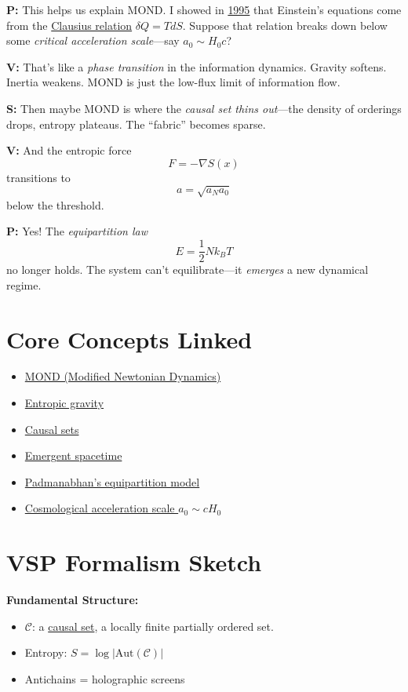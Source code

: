 \documentclass[12pt]{article}
\begin{document}
\textbf{P:} This helps us explain MOND. I showed in \href{https://arxiv.org/abs/gr-qc/9504004}{1995} that Einstein’s equations come from the \href{https://en.wikipedia.org/wiki/Clausius_relation}{Clausius relation} \( \delta Q = T dS \). Suppose that relation breaks down below some \textit{critical acceleration scale}—say \( a_0 \sim H_0 c \)?

\textbf{V:} That’s like a \textit{phase transition} in the information dynamics. Gravity softens. Inertia weakens. MOND is just the low-flux limit of information flow.

\textbf{S:} Then maybe MOND is where the \textit{causal set thins out}—the density of orderings drops, entropy plateaus. The ``fabric'' becomes sparse.

\textbf{V:} And the entropic force 
\[
F = -\nabla S(x)
\]
transitions to 
\[
a = \sqrt{a_N a_0}
\]
below the threshold.

\textbf{P:} Yes! The \textit{equipartition law}
\[
E = \frac{1}{2} N k_B T
\]
no longer holds. The system can’t equilibrate—it \textit{emerges} a new dynamical regime.

\section*{Core Concepts Linked}

\begin{itemize}
    \item \href{https://en.wikipedia.org/wiki/Modified_Newtonian_dynamics}{MOND (Modified Newtonian Dynamics)}
    \item \href{https://en.wikipedia.org/wiki/Entropic_gravity}{Entropic gravity}
    \item \href{https://en.wikipedia.org/wiki/Causal_set_theory}{Causal sets}
    \item \href{https://arxiv.org/abs/gr-qc/0606061}{Emergent spacetime}
    \item \href{https://arxiv.org/abs/0912.3165}{Padmanabhan’s equipartition model}
    \item \href{https://arxiv.org/abs/1609.05917}{Cosmological acceleration scale \( a_0 \sim c H_0 \)}
\end{itemize}

\section*{VSP Formalism Sketch}

\textbf{Fundamental Structure:}
\begin{itemize}
    \item \( \mathcal{C} \): a \href{https://arxiv.org/abs/gr-qc/0309009}{causal set}, a locally finite partially ordered set.
    \item Entropy: \( S = \log |\mathrm{Aut}(\mathcal{C})| \)
    \item Antichains = holographic screens
\end{itemize}
\end{document}

